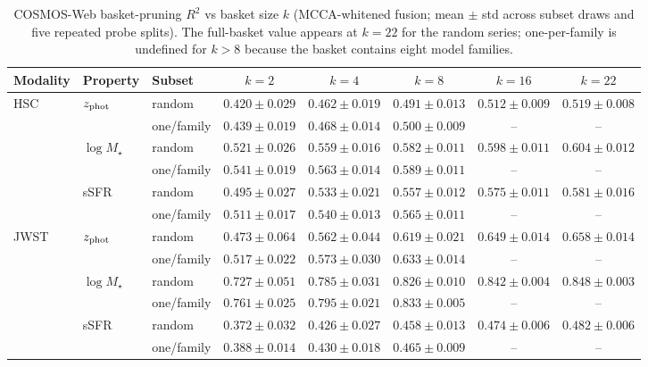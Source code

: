 \begin{table}[t]
\centering
\scriptsize
\setlength{\tabcolsep}{4pt}
\caption{COSMOS-Web basket-pruning $R^2$ vs basket size $k$ (MCCA-whitened fusion; mean $\pm$ std across subset draws and five repeated probe splits). The full-basket value appears at $k{=}22$ for the random series; one-per-family is undefined for $k{>}8$ because the basket contains eight model families.}
\label{tab:scaling-values}
\begin{tabular}{lllccccc}
\toprule
Modality & Property & Subset & $k{=}2$ & $k{=}4$ & $k{=}8$ & $k{=}16$ & $k{=}22$ \\
\midrule
HSC & $z_{\rm phot}$ & random & $0.420 \pm 0.029$ & $0.462 \pm 0.019$ & $0.491 \pm 0.013$ & $0.512 \pm 0.009$ & $0.519 \pm 0.008$ \\
 &  & one/family & $0.439 \pm 0.019$ & $0.468 \pm 0.014$ & $0.500 \pm 0.009$ & -- & -- \\
 & $\log M_\star$ & random & $0.521 \pm 0.026$ & $0.559 \pm 0.016$ & $0.582 \pm 0.011$ & $0.598 \pm 0.011$ & $0.604 \pm 0.012$ \\
 &  & one/family & $0.541 \pm 0.019$ & $0.563 \pm 0.014$ & $0.589 \pm 0.011$ & -- & -- \\
 & sSFR & random & $0.495 \pm 0.027$ & $0.533 \pm 0.021$ & $0.557 \pm 0.012$ & $0.575 \pm 0.011$ & $0.581 \pm 0.016$ \\
 &  & one/family & $0.511 \pm 0.017$ & $0.540 \pm 0.013$ & $0.565 \pm 0.011$ & -- & -- \\
\midrule
JWST & $z_{\rm phot}$ & random & $0.473 \pm 0.064$ & $0.562 \pm 0.044$ & $0.619 \pm 0.021$ & $0.649 \pm 0.014$ & $0.658 \pm 0.014$ \\
 &  & one/family & $0.517 \pm 0.022$ & $0.573 \pm 0.030$ & $0.633 \pm 0.014$ & -- & -- \\
 & $\log M_\star$ & random & $0.727 \pm 0.051$ & $0.785 \pm 0.031$ & $0.826 \pm 0.010$ & $0.842 \pm 0.004$ & $0.848 \pm 0.003$ \\
 &  & one/family & $0.761 \pm 0.025$ & $0.795 \pm 0.021$ & $0.833 \pm 0.005$ & -- & -- \\
 & sSFR & random & $0.372 \pm 0.032$ & $0.426 \pm 0.027$ & $0.458 \pm 0.013$ & $0.474 \pm 0.006$ & $0.482 \pm 0.006$ \\
 &  & one/family & $0.388 \pm 0.014$ & $0.430 \pm 0.018$ & $0.465 \pm 0.009$ & -- & -- \\
\bottomrule
\end{tabular}
\end{table}
